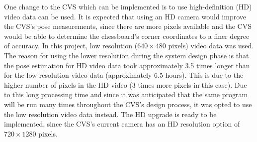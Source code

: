 One change to the CVS which can be implemented is to use high-definition (HD) video data can be used. It is expected that using an HD camera would improve the CVS's pose measurements, since there are more pixels available and the CVS would be able to determine the chessboard's corner coordinates to a finer degree of accuracy. In this project, low resolution ($640\times480$ pixels) video data was used. The reason for using the lower resolution during the system design phase is that the pose estimation for HD video data took approximately 3.5 times longer than for the low resolution video data (approximately 6.5 hours). This is due to the higher number of pixels in the HD video (3 times more pixels in this case). Due to this long processing time and since it was anticipated that the same program will be run many times throughout the CVS's design process, it was opted to use the low resolution video data instead. The HD upgrade is ready to be implemented, since the CVS's current camera has an HD resolution option of $720\times1280$ pixels. 




